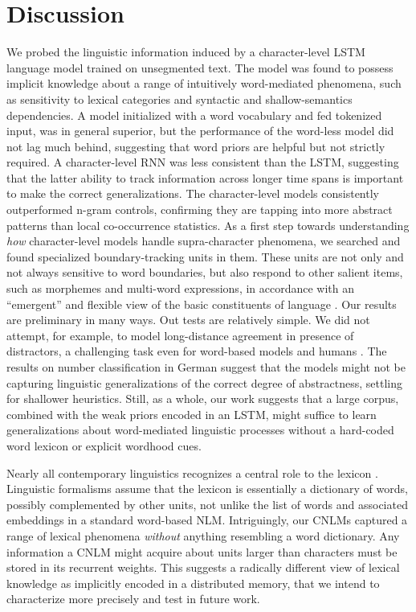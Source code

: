 \section{Discussion}
\label{sec:discussion}

We probed the linguistic information induced by a character-level LSTM
language model trained on unsegmented text. The model was found to
possess implicit knowledge about a range of intuitively word-mediated
phenomena, such as sensitivity to lexical categories and syntactic and
shallow-semantics dependencies. A model initialized with a word
vocabulary and fed tokenized input, was in general superior, but the
performance of the word-less model did not lag much behind, suggesting
that word priors are helpful but not strictly required. A
character-level RNN was less consistent than the LSTM, suggesting that
the latter ability to track information across longer time
spans is important to make the correct generalizations. The
character-level models consistently outperformed n-gram controls,
confirming they are tapping into more abstract patterns than local
co-occurrence statistics. As a first step towards understanding
\emph{how} character-level models handle supra-character phenomena, we
searched and found specialized boundary-tracking units in them. These
units are not only and not always sensitive to word boundaries, but
also respond to other salient items, such as morphemes and multi-word
expressions, in accordance with an ``emergent'' and flexible view of
the basic constituents of language \cite{Schiering:etal:2010}. Our
results are preliminary in many ways. Out tests are relatively
simple. We did not attempt, for example, to model long-distance
agreement in presence of distractors, a challenging task even for
word-based models and humans \citep{Gulordava:etal:2018}. The results
on number classification in German suggest that the models might not
be capturing linguistic generalizations of the correct degree of
abstractness, settling for shallower heuristics. Still, as a whole,
our work suggests that a large corpus, combined with the weak priors
encoded in an LSTM, might suffice to learn generalizations about
word-mediated linguistic processes without a hard-coded word lexicon
or explicit wordhood cues.

Nearly all contemporary linguistics recognizes a central role to the
lexicon \cite[see, e.g.,][for very different
perspectives]{Sag:etal:2003,Goldberg:2005,Radford:2006,Bresnan:etal:2016,Jezek:2016}. Linguistic
formalisms assume that the lexicon is essentially a dictionary
of words, possibly complemented by other units, not unlike the list of
words and associated embeddings in a standard word-based
NLM. Intriguingly, our CNLMs captured a range of lexical phenomena
\emph{without} anything resembling a word dictionary. Any information
a CNLM might acquire about units larger than characters must be stored
in its recurrent weights. This suggests a radically different view of
lexical knowledge as implicitly encoded in a distributed memory, that
we intend to characterize more precisely and test in future work.

